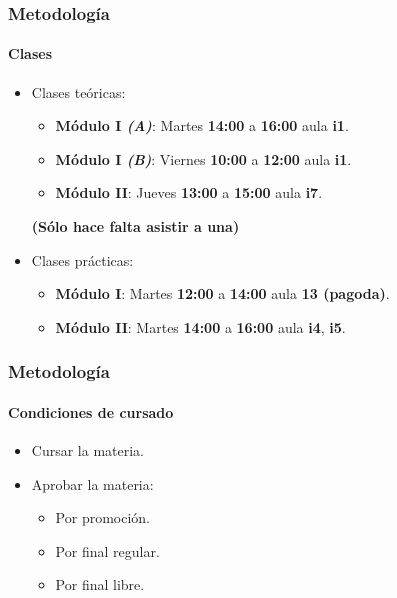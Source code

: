\documentclass[11pt,a4paper,spanish]{beamer}
\begin{document}
\begin{frame}

    \frametitle{Metodología}
    \framesubtitle{Clases}

\begin{itemize}
    \item Clases teóricas:
    \begin{itemize}
        \item \textbf{Módulo I \emph{(A)}}: Martes \textbf{14:00} a
            \textbf{16:00} aula \textbf{i1}.
        \item \textbf{Módulo I \emph{(B)}}: Viernes \textbf{10:00} a
            \textbf{12:00} aula \textbf{i1}.
        \item \textbf{Módulo II}: Jueves \textbf{13:00} a \textbf{15:00} aula
            \textbf{i7}.
    \end{itemize}
        \textbf{(Sólo hace falta asistir a una)}
    \item Clases prácticas:
    \begin{itemize}
        \item \textbf{Módulo I}: Martes \textbf{12:00} a \textbf{14:00} aula
            \textbf{13 (pagoda)}.
        \item \textbf{Módulo II}: Martes \textbf{14:00} a \textbf{16:00} aula
            \textbf{i4}, \textbf{i5}.
    \end{itemize}

\end{itemize}

\end{frame}

\begin{frame}

    \frametitle{Metodología}
    \framesubtitle{Condiciones de cursado}

\begin{itemize}
    \item Cursar la materia.
    \item Aprobar la materia:
        \begin{itemize}
            \item Por promoción.
            \item Por final regular.
            \item Por final libre.
        \end{itemize}
\end{itemize}

\end{frame}
\end{document}

